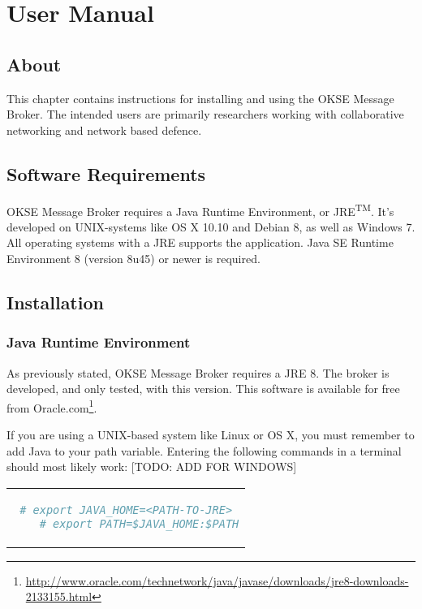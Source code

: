 \chapter{User Manual}

\section{About}

This chapter contains instructions for installing and using the OKSE Message Broker. The intended users are primarily researchers working with collaborative networking and network based defence. 

\section{Software Requirements}

OKSE Message Broker requires a Java Runtime Environment, or JRE\textsuperscript{TM}. It's developed on UNIX-systems like OS X 10.10 and Debian 8, as well as Windows 7. All operating systems with a JRE supports the application. Java SE Runtime Environment 8 (version 8u45) or newer is required. 

\section{Installation}

\subsection{Java Runtime Environment}

As previously stated, OKSE Message Broker requires a JRE 8. The broker is developed, and only tested, with this version. This software is available for free from Oracle.com\footnote{\url{http://www.oracle.com/technetwork/java/javase/downloads/jre8-downloads-2133155.html}}.

If you are using a UNIX-based system like Linux or OS X, you must remember to add Java to your path variable. Entering the following commands in a terminal should most likely work: [TODO: ADD FOR WINDOWS]

\begin{center}
\begin{tabular}{c}
\begin{lstlisting}[language=bash]
    # export JAVA_HOME=<PATH-TO-JRE>
    # export PATH=$JAVA_HOME:$PATH
\end{lstlisting}
\end{tabular}
\end{center}

